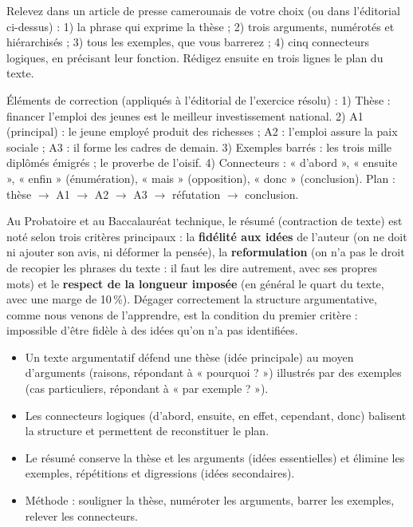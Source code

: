 \documentclass[11pt]{article}
\newcommand{\cle}[1]{{\popxbold\color{popdark}#1}}
\begin{document}
\begin{exercice}
Relevez dans un article de presse camerounais de votre choix (ou dans l'éditorial ci-dessus) : 1) la phrase qui exprime la thèse ; 2) trois arguments, numérotés et hiérarchisés ; 3) tous les exemples, que vous barrerez ; 4) cinq connecteurs logiques, en précisant leur fonction. Rédigez ensuite en trois lignes le plan du texte.
\end{exercice}

\begin{corrige}[Exercice]
Éléments de correction (appliqués à l'éditorial de l'exercice résolu) : 1) Thèse : financer l'emploi des jeunes est le meilleur investissement national. 2) A1 (principal) : le jeune employé produit des richesses ; A2 : l'emploi assure la paix sociale ; A3 : il forme les cadres de demain. 3) Exemples barrés : les trois mille diplômés émigrés ; le proverbe de l'oisif. 4) Connecteurs : « d'abord », « ensuite », « enfin » (énumération), « mais » (opposition), « donc » (conclusion). Plan : thèse $\rightarrow$ A1 $\rightarrow$ A2 $\rightarrow$ A3 $\rightarrow$ réfutation $\rightarrow$ conclusion.
\end{corrige}

\begin{savaistu}
Au Probatoire et au Baccalauréat technique, le résumé (contraction de texte) est noté selon trois critères principaux : la \textbf{fidélité aux idées} de l'auteur (on ne doit ni ajouter son avis, ni déformer la pensée), la \textbf{reformulation} (on n'a pas le droit de recopier les phrases du texte : il faut les dire autrement, avec ses propres mots) et le \textbf{respect de la longueur imposée} (en général le quart du texte, avec une marge de 10\,\%). Dégager correctement la structure argumentative, comme nous venons de l'apprendre, est la condition du premier critère : impossible d'être fidèle à des idées qu'on n'a pas identifiées.
\end{savaistu}

\begin{aretenir}
\begin{itemize}
\item Un texte argumentatif défend une \cle{thèse} (idée principale) au moyen d'\cle{arguments} (raisons, répondant à « pourquoi ? ») illustrés par des \cle{exemples} (cas particuliers, répondant à « par exemple ? »).
\item Les \cle{connecteurs logiques} (d'abord, ensuite, en effet, cependant, donc) balisent la structure et permettent de reconstituer le plan.
\item Le résumé conserve la thèse et les arguments (idées essentielles) et élimine les exemples, répétitions et digressions (idées secondaires).
\item Méthode : souligner la thèse, numéroter les arguments, barrer les exemples, relever les connecteurs.
\end{itemize}
\end{aretenir}
\end{document}
